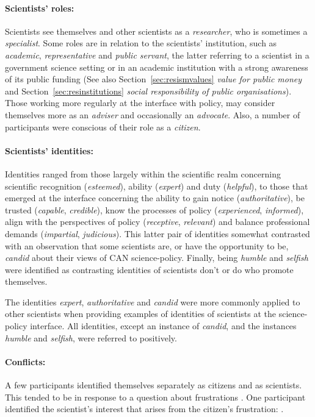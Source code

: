 \paragraph{Scientists' roles:}
Scientists see themselves and other scientists as a \emph{researcher}, who is sometimes a \emph{specialist}. Some roles are in relation to the scientists' institution, such as \emph{academic}, \emph{representative} and \emph{public servant}, the latter referring to a scientist in a government science setting or in an academic institution with a strong awareness of its public funding (See also Section~\ref{sec:resismvalues} \emph{value for public money} and Section~\ref{sec:resinstitutions} \emph{social responsibility of public organisations}). Those working more regularly at the interface with policy, may consider themselves more as an \emph{adviser} and occasionally an \emph{advocate}. Also, a number of participants were conscious of their role as a \emph{citizen}.

\paragraph{Scientists' identities:}
Identities ranged from those largely within the scientific realm concerning scientific recognition (\emph{esteemed}), ability (\emph{expert}) and duty (\emph{helpful}), to those that emerged at the interface concerning the ability to gain notice (\emph{authoritative}), be trusted (\emph{capable}, \emph{credible}), know the processes of policy (\emph{experienced}, \emph{informed}), align with the perspectives of policy (\emph{receptive}, \emph{relevant}) and balance professional demands (\emph{impartial}, \emph{judicious}). This latter pair of identities somewhat contrasted with an observation that some scientists are, or have the opportunity to be, \emph{candid} about their views of CAN science-policy. Finally, being \emph{humble} and \emph{selfish} were identified as contrasting identities of scientists don't or do who promote themselves.

The identities \emph{expert}, \emph{authoritative} and \emph{candid} were more commonly applied to other scientists when providing examples of identities of scientists at the science-policy interface. All identities, except an instance of \emph{candid}, and the instances \emph{humble} and \emph{selfish}, were referred to positively.

\paragraph{Conflicts:}
A few participants identified themselves separately as citizens and as scientists. This tended to be in response to a question about frustrations . One participant identified the scientist's interest that arises from the citizen's frustration: .

